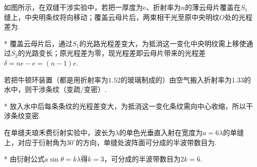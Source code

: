 \begin{problem}[双缝干涉][6]
    如图所示，在双缝干涉实验中，若把一厚度为$e$、折射率为$n$的薄云母片覆盖在$S_1$缝上，中央明条纹将向移动；覆盖云母片后，两束相干光至原中央明纹$O$处的光程差为.
\end{problem}
\begin{solution}*
    覆盖云母片后，通过$S_1$的光路光程差变大，为抵消这一变化中央明纹需上移使通过$S_2$的光路变长；原光程差为零，现光程差即云母片带来的光程差$\delta=ne-e=(n-1)e$.
\end{solution}

\begin{problem}[牛顿环][3]
    若把牛顿环装置（都是用折射率为$1.52$的玻璃制成的）由空气搬入折射率为$1.33$的水中，则干涉条纹（变疏/变密）.
\end{problem}
\begin{solution}*
    放入水中后每条条纹的光程差变大，为抵消这一变化条纹需向中心收缩，所以干涉条纹变密.
\end{solution}

\begin{problem}[弗琅禾费衍射][3]
    在单缝夫琅禾费衍射实验中，波长为$\lambda$的单色光垂直入射在宽度为$a=6\lambda$的单缝上，对应于衍射角为$30^\circ$的方向，单缝处波阵面可分成的半波带数目为.
\end{problem}
\begin{solution}*
    由衍射公式$a\sin{\theta}=k\lambda$得$k=3$，可分成的半波带数目为$2k=6$.
\end{solution}

